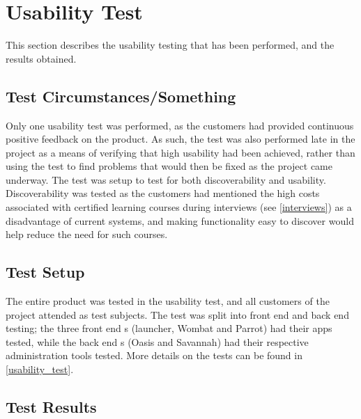 \section{Usability Test}
This section describes the usability testing that has been performed, and the results obtained. 

\subsection{Test Circumstances/Something}
Only one usability test was performed, as the customers had provided continuous positive feedback on the product. 
As such, the test was also performed late in the project as a means of verifying that high usability had been achieved, rather than using the test to find problems that would then be fixed as the project came underway. \newline
The test was setup to test for both discoverability and usability. 
Discoverability was tested as the customers had mentioned the high costs associated with certified learning courses during interviews (see \autoref{interviews}) as a disadvantage of current systems, and making functionality easy to discover would help reduce the need for such courses.

\subsection{Test Setup}
The entire \giraf[] product was tested in the usability test, and all customers of the project attended as test subjects. 
The test was split into front end and back end testing; the three front end \localgroup[]s (launcher, Wombat and Parrot) had their apps tested, while the back end \localgroup[]s (Oasis and Savannah) had their respective administration tools tested. 
More details on the tests can be found in \autoref{usability_test}.

\subsection{Test Results}
